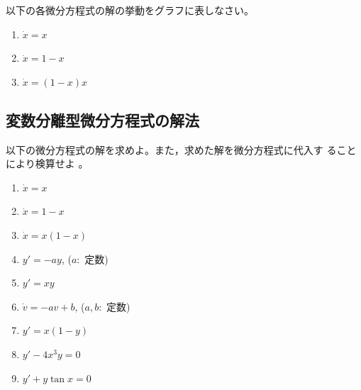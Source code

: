 \documentclass[twocolumn,11pt]{jarticle}
\begin{document}
\nquestion
以下の各微分方程式の解の挙動をグラフに表しなさい。
\begin{enumerate}
\item $\dot{x}=x$
\item $\dot{x}=1-x$
\item $\dot{x}=(1-x)x$
\end{enumerate}


\subsection{変数分離型微分方程式の解法}
以下の微分方程式の解を求めよ。また，求めた解を微分方程式に代入す
ることにより検算せよ
。
\begin{enumerate}
\item \label{item:dx=x}$\dot{x}=x$
\item \label{item:dx=1-x} $\dot{x}=1-x$
\item \label{item:dx=x(1-x)} $\dot{x}=x(1-x)$
\item \label{item:dy+ay}$y'=-ay$, ($a:$ 定数)
\item \label{item:dy-xy}$y'=xy$
\item \label{item:dv+av-b}$\dot{v}=-av+b$, \quad($a,b:$ 定数)
\item \label{item:dy-x(1-y)}$y'=x(1-y)$
\item \label{item:dy-4x3y}$y'-4x^3y=0$
\item \label{item:dy+ytanx}$y'+y\tan x=0$
\end{enumerate}
\end{document}
